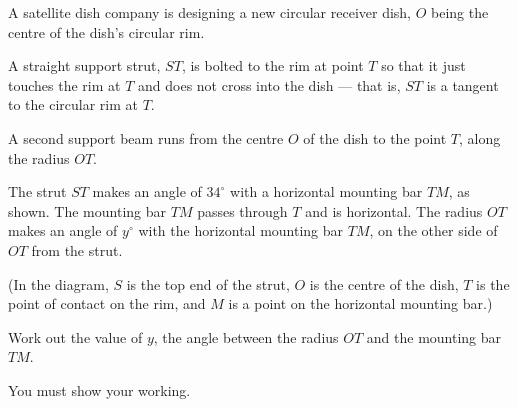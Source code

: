\begin{question}
\noindent A satellite dish company is designing a new circular receiver dish, $O$ being the centre of the dish's circular rim.

A straight support strut, $ST$, is bolted to the rim at point $T$ so that it just touches the rim at $T$ and does not cross into the dish — that is, $ST$ is a tangent to the circular rim at $T$.

A second support beam runs from the centre $O$ of the dish to the point $T$, along the radius $OT$.

The strut $ST$ makes an angle of $34^\circ$ with a horizontal mounting bar $TM$, as shown. The mounting bar $TM$ passes through $T$ and is horizontal. The radius $OT$ makes an angle of $y^\circ$ with the horizontal mounting bar $TM$, on the other side of $OT$ from the strut.

\begin{center}
\end{center}

\noindent (In the diagram, $S$ is the top end of the strut, $O$ is the centre of the dish, $T$ is the point of contact on the rim, and $M$ is a point on the horizontal mounting bar.)

Work out the value of $y$, the angle between the radius $OT$ and the mounting bar $TM$.

You must show your working.
\vspace{5cm}
\end{question}